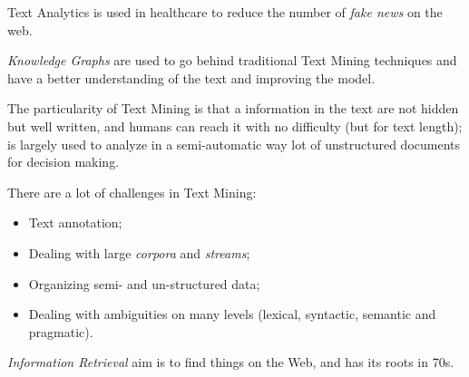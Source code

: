 \documentclass[11pt, a4page]{article}
\begin{document}
Text Analytics is used in healthcare to reduce the number of \textit{fake news} on the web.

\textit{Knowledge Graphs} are used to go behind traditional Text Mining techniques and have a better understanding of the text and improving the model.

The particularity of Text Mining is that a information in the text are not hidden but well written, and humans can reach it with no difficulty (but for text length); is largely used to analyze in a semi-automatic way lot of unstructured documents for decision making.

There are a lot of challenges in Text Mining:
\begin{itemize}[noitemsep]
\item Text annotation;
\item Dealing with large \textit{corpora} and \textit{streams};
\item Organizing semi- and un-structured data;
\item Dealing with ambiguities on many levels (lexical, syntactic, semantic and pragmatic).
\end{itemize}

\textit{Information Retrieval} aim is to find things on the Web, and has its roots in 70s.
\end{document}
